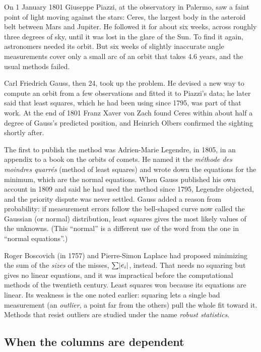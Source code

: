 \begin{historybox}
On 1 January 1801 Giuseppe Piazzi, at the observatory in Palermo, saw a faint point of light moving
against the stars: Ceres, the largest body in the asteroid belt between Mars and Jupiter. He followed
it for about six weeks, across roughly three degrees of sky, until it was lost in the glare of the
Sun. To find it again, astronomers needed its orbit. But six weeks of slightly inaccurate angle
measurements cover only a small arc of an orbit that takes 4.6 years, and the usual methods failed.

Carl Friedrich Gauss, then 24, took up the problem. He devised a new way to compute an orbit from a
few observations and fitted it to Piazzi's data; he later said that least squares, which he had been
using since 1795, was part of that work. At the end of 1801 Franz Xaver von Zach found Ceres within
about half a degree of Gauss's predicted position, and Heinrich Olbers confirmed the sighting
shortly after.

The first to publish the method was Adrien-Marie Legendre, in 1805, in an appendix to a book on the
orbits of comets. He named it the \emph{méthode des moindres quarrés} (method of least squares) and
wrote down the equations for the minimum, which are the normal equations. When Gauss published his
own account in 1809 and said he had used the method since 1795, Legendre objected, and the priority
dispute was never settled. Gauss added a reason from probability: if measurement errors follow the
bell-shaped curve now called the Gaussian (or normal) distribution, least squares gives the most
likely values of the unknowns. (This ``normal'' is a different use of the word from the one in
``normal equations''.)

Roger Boscovich (in 1757) and Pierre-Simon Laplace had proposed minimizing the sum of the
\emph{sizes} of the misses, $\sum\lvert e_i\rvert$, instead. That needs no squaring but gives no linear
equations, and it was impractical before the computational methods of the twentieth century. Least
squares won because its equations are linear. Its weakness is the one noted earlier: squaring lets
a single bad measurement (an \emph{outlier}, a point far from the others) pull the whole fit toward
it. Methods that resist outliers are studied under the name \emph{robust statistics}.
\end{historybox}

\subsection*{When the columns are dependent}

